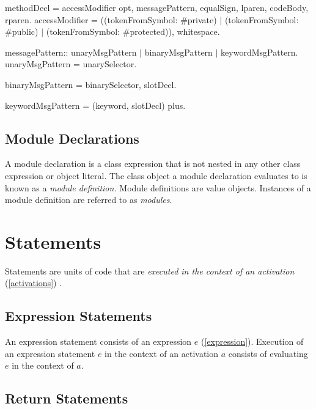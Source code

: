 \documentclass{article}
\begin{document}
\begin{newspeak}
methodDecl = accessModifier opt, messagePattern, equalSign, 
                  lparen, codeBody, rparen.
accessModifier =  ((tokenFromSymbol: {\#private}) $|$ 
                        (tokenFromSymbol: \#public) $|$
                        (tokenFromSymbol: \#protected)), whitespace.
                    
messagePattern::  unaryMsgPattern $|$
                       binaryMsgPattern $|$
                       keywordMsgPattern.
unaryMsgPattern = unarySelector.

binaryMsgPattern = binarySelector, slotDecl.  
                                                         
keywordMsgPattern = (keyword, slotDecl) plus.   
\end{newspeak}


\subsection{Module Declarations} 
\label{module}

A module declaration is a class expression that is not nested in any other class expression or object literal.  The class object a module declaration evaluates to is known as a {\em module definition.} Module definitions are value objects.  Instances of a module definition are referred to as {\em modules}.


\section{Statements}
\label{statement}

Statements are units of code that are {\em executed in the context of an activation}  (\ref{activations}) .


\subsection{Expression Statements}
\label{expr}

An expression statement consists of an expression $e$  (\ref{expression}). Execution of an expression statement $e$ in the context of an activation $a$ consists of evaluating $e$ in the context of $a$. 


\subsection{Return Statements}
\label{return}
\end{document}
